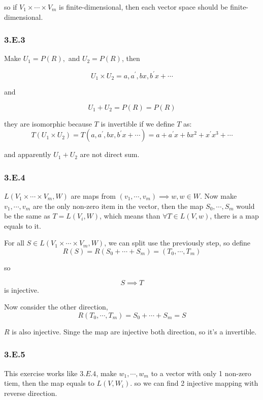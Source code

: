 so if $V_{1} \times \cdots \times V_{m}$ is finite-dimensional, then each vector space should be finite-dimensional.

\subsubsection*{3.E.3}

Make $U_{1} = P(R), $ and $U_{2} = P(R)$, then 

\[U_{1} \times U_{2} = a, a^{'}, bx, b^{'}x + \cdots \]

and 

\[U_{1} + U_{2} = P(R) = P(R)\]

they are isomorphic because $T$ is invertible if we define $T$ as:
\[T(U_{1} \times U_{2}) = T(a, a^{'}, bx, b^{'}x + \cdots) = a + a^{'}x + bx^{2} + x^{'}x^{3} + \cdots\]

and apparently $U_{1}+U_{2}$ are not direct sum.

\subsubsection*{3.E.4}

$L(V_{1}\times \cdots \times V_{m}, W)$ are maps from $(v_{1}, \cdots, v_{m}) \implies w, w\in W$. Now make $v_{1}, \cdots, v_{m}$ are the only non-zero item in the vector, then the map $S_{0}, \cdots, S_{m}$ would be the same as $T = L(V_{i}, W)$, which means than $\forall T\in L(V, w)$, there is a map equals to it.

For all $S \in L(V_{1}\times \cdots \times V_{m}, W)$, we can split use the previously step, so define
\[R(S) = R(S_{0} + \cdots + S_{m}) = (T_{0} , \cdots , T_{m}) \]

so 

\[S\implies T\] is injective.

Now consider the other direction, 
\[R(T_{0} , \cdots , T_{m}) = S_{0} + \cdots + S_{m} = S\]

$R$ is also injective. Singe the map are injective both direction, so it's a invertible.

\subsubsection*{3.E.5}

This exercise works like $3.E.4$, make $w_{1}, \cdots, w_{m}$ to a vector with only 1 non-zero tiem, then the map equals to $L(V, W_{i})$. so we can find 2 injective mapping with reverse direction.

